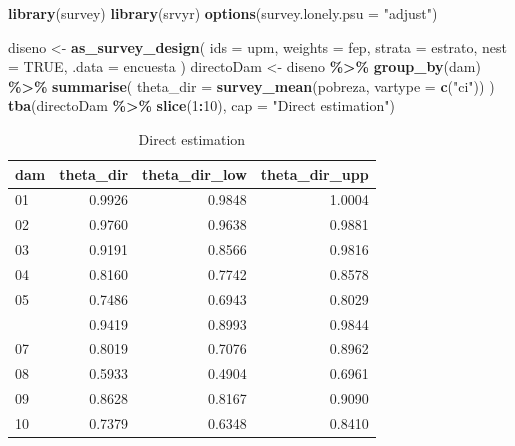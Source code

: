 \documentclass[
  12pt,
]{book}
\newenvironment{Shaded}{\begin{snugshade}}{\end{snugshade}}
\newcommand{\AttributeTok}[1]{\textcolor[rgb]{0.13,0.29,0.53}{#1}}
\newcommand{\ConstantTok}[1]{\textcolor[rgb]{0.56,0.35,0.01}{#1}}
\newcommand{\DecValTok}[1]{\textcolor[rgb]{0.00,0.00,0.81}{#1}}
\newcommand{\FunctionTok}[1]{\textcolor[rgb]{0.13,0.29,0.53}{\textbf{#1}}}
\newcommand{\NormalTok}[1]{#1}
\newcommand{\OtherTok}[1]{\textcolor[rgb]{0.56,0.35,0.01}{#1}}
\newcommand{\SpecialCharTok}[1]{\textcolor[rgb]{0.81,0.36,0.00}{\textbf{#1}}}
\newcommand{\StringTok}[1]{\textcolor[rgb]{0.31,0.60,0.02}{#1}}
\begin{document}
\begin{Shaded}
\begin{Highlighting}[]
\FunctionTok{library}\NormalTok{(survey)}
\FunctionTok{library}\NormalTok{(srvyr)}
\FunctionTok{options}\NormalTok{(}\AttributeTok{survey.lonely.psu =} \StringTok{"adjust"}\NormalTok{)}

\NormalTok{diseno }\OtherTok{\textless{}{-}}
  \FunctionTok{as\_survey\_design}\NormalTok{(}
    \AttributeTok{ids =}\NormalTok{ upm,}
    \AttributeTok{weights =}\NormalTok{ fep,}
    \AttributeTok{strata =}\NormalTok{ estrato,}
    \AttributeTok{nest =} \ConstantTok{TRUE}\NormalTok{,}
    \AttributeTok{.data =}\NormalTok{ encuesta}
\NormalTok{  )}
\NormalTok{directoDam }\OtherTok{\textless{}{-}}\NormalTok{ diseno }\SpecialCharTok{\%\textgreater{}\%} 
    \FunctionTok{group\_by}\NormalTok{(dam) }\SpecialCharTok{\%\textgreater{}\%} 
  \FunctionTok{summarise}\NormalTok{(}
    \AttributeTok{theta\_dir =} \FunctionTok{survey\_mean}\NormalTok{(pobreza, }\AttributeTok{vartype =} \FunctionTok{c}\NormalTok{(}\StringTok{"ci"}\NormalTok{))}
\NormalTok{    )}
\FunctionTok{tba}\NormalTok{(directoDam }\SpecialCharTok{\%\textgreater{}\%} \FunctionTok{slice}\NormalTok{(}\DecValTok{1}\SpecialCharTok{:}\DecValTok{10}\NormalTok{), }\AttributeTok{cap =} \StringTok{"Direct estimation"}\NormalTok{)}
\end{Highlighting}
\end{Shaded}

\begin{table}[H]

\caption{\label{tab:unnamed-chunk-19}Direct estimation}
\centering
\begin{tabular}[t]{lrrr}
\toprule
dam & theta\_dir & theta\_dir\_low & theta\_dir\_upp\\
\midrule
01 & 0.9926 & 0.9848 & 1.0004\\
02 & 0.9760 & 0.9638 & 0.9881\\
03 & 0.9191 & 0.8566 & 0.9816\\
04 & 0.8160 & 0.7742 & 0.8578\\
05 & 0.7486 & 0.6943 & 0.8029\\
\addlinespace
06 & 0.9419 & 0.8993 & 0.9844\\
07 & 0.8019 & 0.7076 & 0.8962\\
08 & 0.5933 & 0.4904 & 0.6961\\
09 & 0.8628 & 0.8167 & 0.9090\\
10 & 0.7379 & 0.6348 & 0.8410\\
\bottomrule
\end{tabular}
\end{table}
\end{document}
